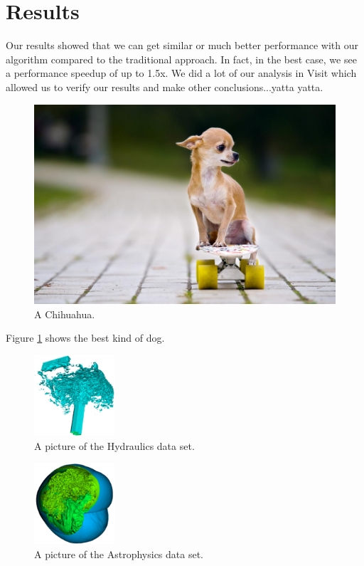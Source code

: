 \documentclass{IEEEtran}
\begin{document}
\section{Results}
Our results showed that we can get similar or much better performance with our algorithm compared to the traditional approach. 
%
In fact, in the best case, we see a performance speedup of up to 1.5x.
%
We did a lot of our analysis in Visit \cite{visit} which allowed us to verify our results and make other conclusions...yatta yatta.
%
\begin{figure}
  \includegraphics[width=\linewidth]{images/chichi.jpg}
  \caption{A Chihuahua.}
  \label{fig:chichi}
\end{figure}
%
Figure \ref{fig:chichi} shows the best kind of dog.
%
\begin{figure}
  \includegraphics[width=3cm]{images/hydraulics.png}
  \caption{A picture of the Hydraulics data set.}
  \label{fig:hydr}
\end{figure}
%
\begin{figure}
  \includegraphics[width=3cm]{images/Supernova_Astro.png}
  \caption{A picture of the Astrophysics data set.}
  \label{fig:nova}
\end{figure}
\end{document}
